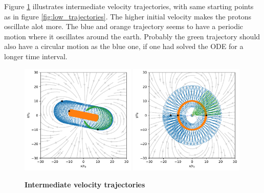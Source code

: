 \documentclass[11pt]{article}
\begin{document}
\noindent Figure \ref{fig:intermediate_trajectories} illustrates intermediate velocity trajectories, with same starting points as in figure \ref{fig:low_trajectories}. The higher initial velocity makes the protons oscillate alot more. The blue and orange trajectory seems to have a periodic motion where it oscillates around the earth. Probably the green trajectory should also have a circular motion as the blue one, if one had solved the ODE for a longer time interval.
\begin{figure}[!htp]
    \centering
    \captionsetup{justification=centering}
    \includegraphics[width=0.49\textwidth]{../figures/report/trajectoriesIntermediateXZ}
    \includegraphics[width=0.49\textwidth]{../figures/report/trajectoriesIntermediateXY}
    \caption{\textbf{Intermediate velocity trajectories}}
    \label{fig:intermediate_trajectories}
\end{figure}
\end{document}
